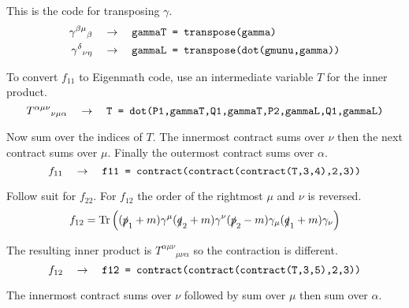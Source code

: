 \documentclass[12pt]{article}
\begin{document}
This is the code for transposing $\gamma$.
\begin{align*}
\gamma^{\beta\mu}{}_\beta
&\quad\rightarrow\quad
\text{\tt gammaT = transpose(gamma)}
\\
\gamma^\delta{}_{\nu\eta}
&\quad\rightarrow\quad
\text{\tt gammaL = transpose(dot(gmunu,gamma))}
\end{align*}

To convert $f_{11}$ to Eigenmath code, use an intermediate variable $T$ for the inner product.
\begin{equation*}
T^{\alpha\mu\nu}{}_{\nu\mu\alpha}
\quad\rightarrow\quad
\text{\tt T = dot(P1,gammaT,Q1,gammaT,P2,gammaL,Q1,gammaL)}
\end{equation*}

Now sum over the indices of $T$.
The innermost contract sums over $\nu$ then the next contract sums over $\mu$.
Finally the outermost contract sums over $\alpha$.
\begin{equation*}
f_{11}\quad\rightarrow\quad
\text{\tt f11 = contract(contract(contract(T,3,4),2,3))}
\end{equation*}

Follow suit for $f_{22}$.
For $f_{12}$ the order of the rightmost $\mu$ and $\nu$ is reversed.
\begin{equation*}
f_{12}=\mathop{\rm Tr}
\left(
(\slashed{p}_1+m)\gamma^\mu(\slashed{q}_2+m)\gamma^\nu(\slashed{p}_2-m)\gamma_\mu(\slashed{q}_1+m)\gamma_\nu
\right)
\end{equation*}

The resulting inner product is $T^{\alpha\mu\nu}{}_{\mu\nu\alpha}$
so the contraction is different.
\begin{equation*}
f_{12}
\quad\rightarrow\quad
\text{\tt f12 = contract(contract(contract(T,3,5),2,3))}
\end{equation*}

The innermost contract sums over $\nu$ followed by sum over $\mu$ then sum over $\alpha$.
\end{document}
